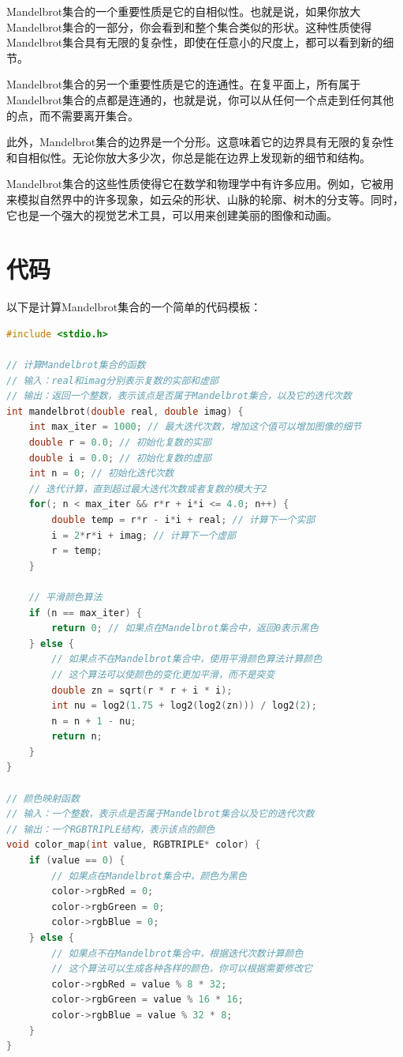 \documentclass{ctexart}
\begin{document}
Mandelbrot集合的一个重要性质是它的自相似性。也就是说，如果你放大Mandelbrot集合的一部分，你会看到和整个集合类似的形状。这种性质使得Mandelbrot集合具有无限的复杂性，即使在任意小的尺度上，都可以看到新的细节。

Mandelbrot集合的另一个重要性质是它的连通性。在复平面上，所有属于Mandelbrot集合的点都是连通的，也就是说，你可以从任何一个点走到任何其他的点，而不需要离开集合。

此外，Mandelbrot集合的边界是一个分形。这意味着它的边界具有无限的复杂性和自相似性。无论你放大多少次，你总是能在边界上发现新的细节和结构。

Mandelbrot集合的这些性质使得它在数学和物理学中有许多应用。例如，它被用来模拟自然界中的许多现象，如云朵的形状、山脉的轮廓、树木的分支等。同时，它也是一个强大的视觉艺术工具，可以用来创建美丽的图像和动画。

\section{代码}

以下是计算Mandelbrot集合的一个简单的代码模板：

\begin{lstlisting}[language=C]
#include <stdio.h>

// 计算Mandelbrot集合的函数
// 输入：real和imag分别表示复数的实部和虚部
// 输出：返回一个整数，表示该点是否属于Mandelbrot集合，以及它的迭代次数
int mandelbrot(double real, double imag) {
    int max_iter = 1000; // 最大迭代次数，增加这个值可以增加图像的细节
    double r = 0.0; // 初始化复数的实部
    double i = 0.0; // 初始化复数的虚部
    int n = 0; // 初始化迭代次数
    // 迭代计算，直到超过最大迭代次数或者复数的模大于2
    for(; n < max_iter && r*r + i*i <= 4.0; n++) {
        double temp = r*r - i*i + real; // 计算下一个实部
        i = 2*r*i + imag; // 计算下一个虚部
        r = temp;
    }

    // 平滑颜色算法
    if (n == max_iter) {
        return 0; // 如果点在Mandelbrot集合中，返回0表示黑色
    } else {
        // 如果点不在Mandelbrot集合中，使用平滑颜色算法计算颜色
        // 这个算法可以使颜色的变化更加平滑，而不是突变
        double zn = sqrt(r * r + i * i);
        int nu = log2(1.75 + log2(log2(zn))) / log2(2);
        n = n + 1 - nu;
        return n;
    }
}

// 颜色映射函数
// 输入：一个整数，表示点是否属于Mandelbrot集合以及它的迭代次数
// 输出：一个RGBTRIPLE结构，表示该点的颜色
void color_map(int value, RGBTRIPLE* color) {
    if (value == 0) {
        // 如果点在Mandelbrot集合中，颜色为黑色
        color->rgbRed = 0;
        color->rgbGreen = 0;
        color->rgbBlue = 0;
    } else {
        // 如果点不在Mandelbrot集合中，根据迭代次数计算颜色
        // 这个算法可以生成各种各样的颜色，你可以根据需要修改它
        color->rgbRed = value % 8 * 32;
        color->rgbGreen = value % 16 * 16;
        color->rgbBlue = value % 32 * 8;
    }
}
\end{lstlisting}
\end{document}

